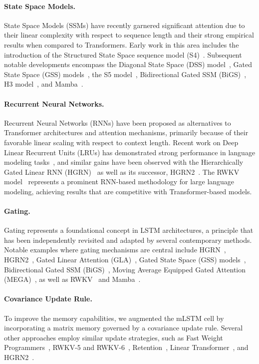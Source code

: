 \paragraph{State Space Models.} State Space Models (SSMs) have recently garnered significant attention due to their linear complexity with respect to sequence length and their strong empirical results when compared to Transformers. Early work in this area includes the introduction of the Structured State Space sequence model (S4)~\citep{Gu:21}. Subsequent notable developments encompass the Diagonal State Space (DSS) model~\citep{Gupta:22}, Gated State Space (GSS) models~\citep{Mehta:22}, the S5 model~\citep{Smith:22}, Bidirectional Gated SSM (BiGS)~\citep{Wang:22}, H3 model~\citep{Fu:23}, and Mamba~\citep{Gu:24arxiv}.

\paragraph{Recurrent Neural Networks.} Recurrent Neural Networks (RNNs) have been proposed as alternatives to Transformer architectures and attention mechanisms, primarily because of their favorable linear scaling with respect to context length. Recent work on Deep Linear Recurrent Units (LRUs) has demonstrated strong performance in language modeling tasks~\citep{Orvieto:23, De:24arxiv}, and similar gains have been observed with the Hierarchically Gated Linear RNN (HGRN)~\citep{Qin:23} as well as its successor, HGRN2~\citep{Qin:24arxiv}. The RWKV model~\citep{Peng:23arxivshort,Peng:24arxivshort} represents a prominent RNN-based methodology for large language modeling, achieving results that are competitive with Transformer-based models.

\paragraph{Gating.}
Gating represents a foundational concept in LSTM architectures, a principle that has been independently revisited and adapted by several contemporary methods. Notable examples where gating mechanisms are central include HGRN~\citep{Qin:23}, HGRN2~\citep{Qin:24arxiv}, Gated Linear Attention (GLA)~\citep{Yang:23arxiv}, Gated State Space (GSS) models~\citep{Mehta:22}, Bidirectional Gated SSM (BiGS)~\citep{Wang:22}, Moving Average Equipped Gated Attention (MEGA)~\citep{Ma:22}, as well as RWKV~\citep{Peng:23arxivshort} and Mamba~\citep{Gu:24arxiv}.

\paragraph{Covariance Update Rule.}  
To improve the memory capabilities, we augmented the mLSTM cell by incorporating a matrix memory governed by a covariance update rule. Several other approaches employ similar update strategies, such as Fast Weight Programmers~\citep{Schmidhuber:92ncfastweights,Schlag:21}, RWKV-5 and RWKV-6~\citep{Peng:24arxivshort}, Retention~\citep{Sun:23arxiv}, Linear Transformer~\citep{Katharopoulos:20}, and HGRN2~\citep{Qin:24arxiv}.

